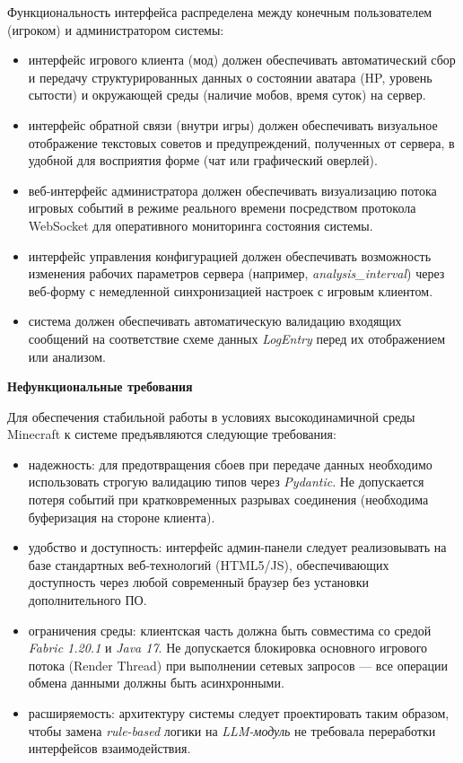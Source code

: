Функциональность интерфейса распределена между конечным пользователем (игроком) и администратором системы:
\begin{itemize}
    \item {интерфейс игрового клиента (мод)} должен обеспечивать автоматический сбор и передачу структурированных данных о состоянии аватара (HP, уровень сытости) и окружающей среды (наличие мобов, время суток) на сервер.
    \item {интерфейс обратной связи (внутри игры)} должен обеспечивать визуальное отображение текстовых советов и предупреждений, полученных от сервера, в удобной для восприятия форме (чат или графический оверлей).
    \item {веб-интерфейс администратора} должен обеспечивать визуализацию потока игровых событий в режиме реального времени посредством протокола WebSocket для оперативного мониторинга состояния системы.
    \item {интерфейс управления конфигурацией} должен обеспечивать возможность изменения рабочих параметров сервера (например, \textit{analysis\_interval}) через веб-форму с немедленной синхронизацией настроек с игровым клиентом.
    \item {система должен обеспечивать} автоматическую валидацию входящих сообщений на соответствие схеме данных \textit{LogEntry} перед их отображением или анализом.
\end{itemize}

\textbf{Нефункциональные требования}

Для обеспечения стабильной работы в условиях высокодинамичной среды Minecraft к системе предъявляются следующие требования:
\begin{itemize}
    \item надежность: для предотвращения сбоев при передаче данных необходимо использовать строгую валидацию типов через \textit{Pydantic}. Не допускается потеря событий при кратковременных разрывах соединения (необходима буферизация на стороне клиента).
    \item удобство и доступность: интерфейс админ-панели следует реализовывать на базе стандартных веб-технологий (HTML5/JS), обеспечивающих доступность через любой современный браузер без установки дополнительного ПО.
    \item ограничения среды: клиентская часть должна быть совместима со средой \textit{Fabric 1.20.1} и \textit{Java 17}\cite{FabricAPI}. Не допускается блокировка основного игрового потока (Render Thread) при выполнении сетевых запросов — все операции обмена данными должны быть асинхронными.
    \item расширяемость: архитектуру системы следует проектировать таким образом, чтобы замена \textit{rule-based} логики на \textit{LLM-модуль} не требовала переработки интерфейсов взаимодействия.
\end{itemize}

